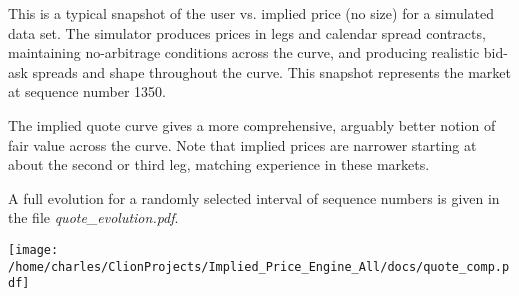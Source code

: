 \documentclass{article}
\begin{document}
This is a typical snapshot of the user vs. implied price (no size) for a simulated data set. The simulator produces prices in legs and calendar spread contracts, maintaining no-arbitrage conditions across the curve, and producing realistic bid-ask spreads and shape throughout the curve. This snapshot represents the market at sequence number 1350.


The implied quote curve gives a more comprehensive, arguably better notion of fair value across the curve. Note that implied prices are narrower starting at about the second or third leg, matching experience in these markets.


A full evolution for a randomly selected interval of sequence numbers is given in the file {\it quote{\_}evolution.pdf}.

\texttt{[image: /home/charles/ClionProjects/Implied\_Price\_Engine\_All/docs/quote\_comp.pdf]}
\end{document}
